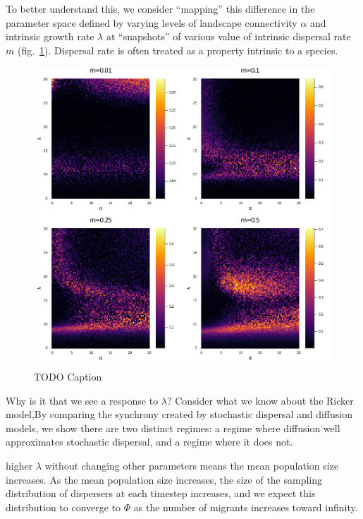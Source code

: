 \documentclass[10pt,oneside]{article}
\makeatletter
\def\maxwidth{\ifdim\Gin@nat@width>\linewidth\linewidth
\else\Gin@nat@width\fi}
\let\Oldincludegraphics\includegraphics
\renewcommand{\includegraphics}[1]{\Oldincludegraphics[width=\maxwidth]{#1}}
\makeatother
\begin{document}
To better understand this, we consider ``mapping'' this difference in
the parameter space defined by varying levels of landscape connectivity
\(\alpha\) and intrinsic growth rate \(\lambda\) at ``snapshots'' of
various value of intrinsic dispersal rate \(m\)
(fig.~\ref{fig:lattice}). Dispersal rate is often treated as a property
intrinsic to a species.

\begin{figure}
\hypertarget{fig:lattice}{%
\centering
\includegraphics{./figures/connectivity_demography_lattice.png}
\caption{TODO Caption}\label{fig:lattice}
}
\end{figure}

Why is it that we see a response to \(\lambda\)? Consider what we know
about the Ricker model,By comparing the synchrony created by stochastic
dispersal and diffusion models, we show there are two distinct regimes:
a regime where diffusion well approximates stochastic dispersal, and a
regime where it does not.

higher \(\lambda\) without changing other parameters means the mean
population size increases. As the mean population size increases, the
size of the sampling distribution of dispersers at each timestep
increases, and we expect this distribution to converge to \(\Phi\) as
the number of migrants increases toward infinity.
\end{document}
